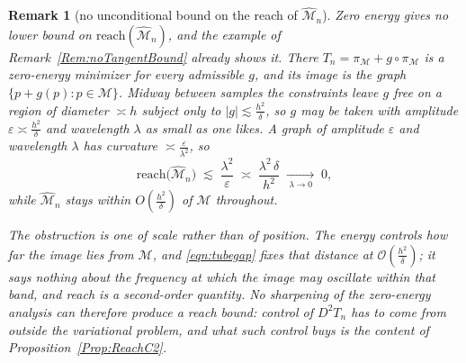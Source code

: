 \documentclass[11pt]{amsart}%
\theoremstyle{plain}
\newtheorem{remark}[definition]{Remark}
\newcommand{\1}{\mathbf{1}}
\newcommand{\M}{\mathcal{M}}
\begin{document}
\begin{remark}[no unconditional bound on the reach of $\widehat{\M}_n$]
    \label{Rem:noReach}
    Zero energy gives no lower bound on $\mathrm{reach}(\widehat{\M}_n)$, and the example of
    Remark~\ref{Rem:noTangentBound} already shows it. There $T_n=\pi_\M+g\circ\pi_\M$ is a
    zero-energy minimizer for every admissible $g$, and its image is the graph
    $\{p+g(p):p\in\M\}$. Midway between samples the constraints leave $g$ free on a region of
    diameter $\asymp h$ subject only to $|g|\lesssim \frac{h^2}{\delta}$, so $g$ may be taken with
    amplitude $\varepsilon\asymp \frac{h^2}{\delta}$ and wavelength $\lambda$ as small as one likes. A graph
    of amplitude $\varepsilon$ and wavelength $\lambda$ has curvature $\asymp\frac{\varepsilon}{\lambda^2}$, so
    \[
        \mathrm{reach}\bigl(\widehat{\M}_n\bigr)\;\lesssim\;\frac{\lambda^2}{\varepsilon}
        \;\asymp\;\frac{\lambda^2\,\delta}{h^2}\;\xrightarrow[\ \lambda\to0\ ]{}\;0 ,
    \]
    while $\widehat{\M}_n$ stays within $O\left(\frac{h^2}{\delta}\right)$ of $\M$ throughout.

    The obstruction is one of scale rather than of position. The energy controls how far the image
    lies from $\M$, and \eqref{eqn:tubegap} fixes that distance at $\mathcal{O}(\frac{h^2}{\delta})$; it says nothing
    about the frequency at which the image may oscillate within that band, and reach is a
    second-order quantity. No sharpening of the zero-energy analysis can therefore produce a reach
    bound: control of $D^2T_n$ has to come from outside the variational problem, and what such
    control buys is the content of Proposition~\ref{Prop:ReachC2}.
\end{remark}
\end{document}
